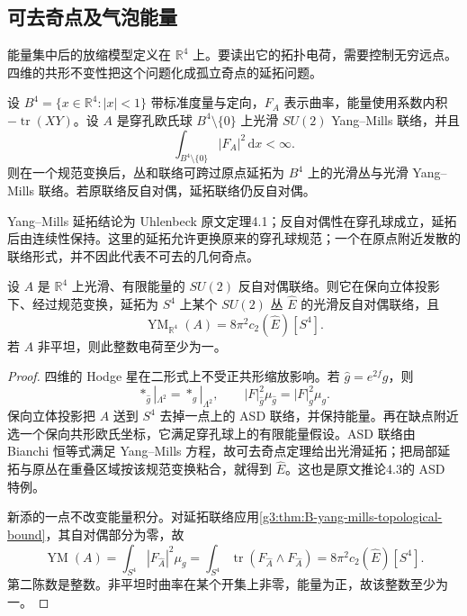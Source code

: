 \subsection{可去奇点及气泡能量}
\label{g3:subsec:B02:04}
能量集中后的放缩模型定义在 \(\mathbb R^4\) 上。要读出它的拓扑电荷，需要控制无穷远点。四维的共形不变性把这个问题化成孤立奇点的延拓问题。

\begin{theorem}\label{g3:thm:B-removable-singularity}
 设 \(B^4=\{x\in\mathbb R^4:|x|<1\}\) 带标准度量与定向，\(F_A\) 表示曲率，能量使用系数内积 \(-\operatorname{tr}(XY)\)。设 \(A\) 是穿孔欧氏球 \(B^4\setminus\{0\}\) 上光滑 \(SU(2)\) Yang--Mills 联络，并且
 \[
  \int_{B^4\setminus\{0\}}|F_A|^2\,\mathrm dx<\infty.
 \]
 则在一个规范变换后，丛和联络可跨过原点延拓为 \(B^4\) 上的光滑丛与光滑 Yang--Mills 联络。若原联络反自对偶，延拓联络仍反自对偶。
\end{theorem}
Yang--Mills 延拓结论为 Uhlenbeck 原文定理4.1；反自对偶性在穿孔球成立，延拓后由连续性保持\cite[定理4.1，第24页]{Uhlenbeck1982Removable}。这里的延拓允许更换原来的穿孔球规范；一个在原点附近发散的联络形式，并不因此代表不可去的几何奇点。

\begin{theorem}\label{g3:thm:B-bubble-energy-quantization}
 设 \(A\) 是 \(\mathbb R^4\) 上光滑、有限能量的 \(SU(2)\) 反自对偶联络。则它在保向立体投影下、经过规范变换，延拓为 \(S^4\) 上某个 \(SU(2)\) 丛 \(\widehat E\) 的光滑反自对偶联络，且
 \[
  \operatorname{YM}_{\mathbb R^4}(A)=8\pi^2c_2(\widehat E)[S^4].
 \]
 若 \(A\) 非平坦，则此整数电荷至少为一。
\end{theorem}
\begin{proof}
 四维的 Hodge 星在二形式上不受正共形缩放影响。若 \(\widehat g=e^{2f}g\)，则
 \[
  *_{\widehat g}|_{\Lambda^2}=*_g|_{\Lambda^2},\qquad
  |F|_{\widehat g}^2\mu_{\widehat g}=|F|_g^2\mu_g.
 \]
 保向立体投影把 \(A\) 送到 \(S^4\) 去掉一点上的 ASD 联络，并保持能量。再在缺点附近选一个保向共形欧氏坐标，它满足穿孔球上的有限能量假设。ASD 联络由 Bianchi 恒等式满足 Yang--Mills 方程，故可去奇点定理给出光滑延拓；把局部延拓与原丛在重叠区域按该规范变换粘合，就得到 \(\widehat E\)。这也是原文推论4.3的 ASD 特例\cite[推论4.3，第24页]{Uhlenbeck1982Removable}。

 新添的一点不改变能量积分。对延拓联络应用\cref{g3:thm:B-yang-mills-topological-bound}，其自对偶部分为零，故
 \[
  \operatorname{YM}(A)
  =\int_{S^4}|F_{\widehat A}|^2\mu_g
  =\int_{S^4}\operatorname{tr}(F_{\widehat A}\wedge F_{\widehat A})
  =8\pi^2c_2(\widehat E)[S^4].
 \]
 第二陈数是整数。非平坦时曲率在某个开集上非零，能量为正，故该整数至少为一。
\end{proof}

